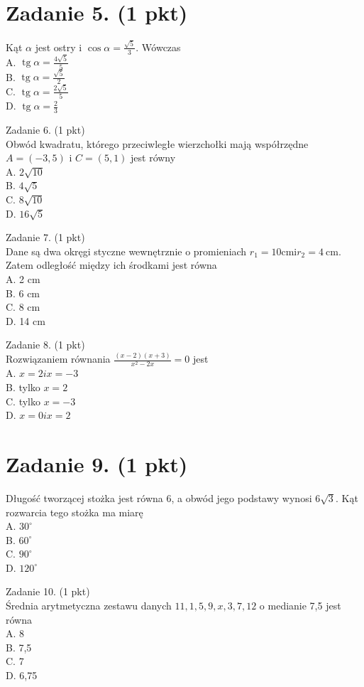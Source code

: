 \documentclass[10pt]{article}
\begin{document}
\section*{Zadanie 5. (1 pkt)}
Kąt \(\alpha\) jest ostry i \(\cos \alpha=\frac{\sqrt{5}}{3}\). Wówczas\\
A. \(\operatorname{tg} \alpha=\frac{4 \sqrt{5}}{5}\)\\
B. \(\operatorname{tg} \alpha=\frac{\sqrt{5}}{2}\)\\
C. \(\operatorname{tg} \alpha=\frac{2 \sqrt{5}}{5}\)\\
D. \(\operatorname{tg} \alpha=\frac{2}{3}\)

Zadanie 6. (1 pkt)\\
Obwód kwadratu, którego przeciwległe wierzchołki mają współrzędne \(A=(-3,5)\) i \(C=(5,1)\) jest równy\\
A. \(2 \sqrt{10}\)\\
B. \(4 \sqrt{5}\)\\
C. \(8 \sqrt{10}\)\\
D. \(16 \sqrt{5}\)

Zadanie 7. (1 pkt)\\
Dane są dwa okręgi styczne wewnętrznie o promieniach \(r_{1}=10 \mathrm{cmi} r_{2}=4 \mathrm{~cm}\). Zatem odległość między ich środkami jest równa\\
A. 2 cm\\
B. 6 cm\\
C. 8 cm\\
D. 14 cm

Zadanie 8. (1 pkt)\\
Rozwiązaniem równania \(\frac{(x-2)(x+3)}{x^{2}-2 x}=0\) jest\\
A. \(x=2 i x=-3\)\\
B. tylko \(x=2\)\\
C. tylko \(x=-3\)\\
D. \(x=0 i x=2\)

\section*{Zadanie 9. (1 pkt)}
Długość tworzącej stożka jest równa 6, a obwód jego podstawy wynosi \(6 \sqrt{3}\). Kąt rozwarcia tego stożka ma miarę\\
A. \(30^{\circ}\)\\
B. \(60^{\circ}\)\\
C. \(90^{\circ}\)\\
D. \(120^{\circ}\)

Zadanie 10. (1 pkt)\\
Średnia arytmetyczna zestawu danych \(11,1,5,9, x, 3,7,12\) o medianie 7,5 jest równa\\
A. 8\\
B. 7,5\\
C. 7\\
D. 6,75
\end{document}
